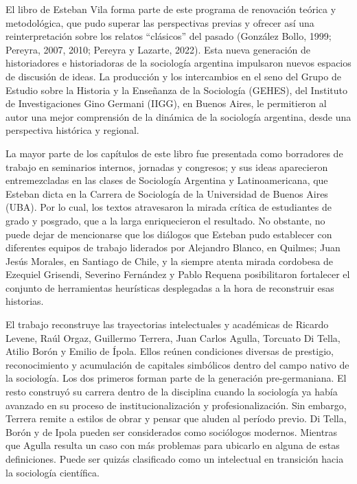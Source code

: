 El libro de Esteban Vila forma parte de este programa de renovación teórica y metodológica, que pudo superar las perspectivas previas y ofrecer así una reinterpretación sobre los relatos \enquote{clásicos} del pasado \parencite{1547-NOE2005,1550-BLOIS2018,1565-BLANCO2006}(González Bollo, 1999; Pereyra, 2007, 2010; Pereyra y Lazarte, 2022). Esta nueva generación de historiadores e historiadoras de la sociología argentina impulsaron nuevos espacios de discusión de ideas. La producción y los intercambios en el seno del Grupo de Estudio sobre la Historia y la Enseñanza de la Sociología (GEHES), del Instituto de Investigaciones Gino Germani (IIGG), en Buenos Aires, le permitieron al autor una mejor comprensión de la dinámica de la sociología argentina, desde una perspectiva histórica y regional.

La mayor parte de los capítulos de este libro fue presentada como borradores de trabajo en seminarios internos, jornadas y congresos; y sus ideas aparecieron entremezcladas en las clases de Sociología Argentina y Latinoamericana, que Esteban dicta en la Carrera de Sociología de la Universidad de Buenos Aires (UBA). Por lo cual, los textos atravesaron la mirada crítica de estudiantes de grado y posgrado, que a la larga enriquecieron el resultado. No obstante, no puede dejar de mencionarse que los diálogos que Esteban pudo establecer con diferentes equipos de trabajo liderados por Alejandro Blanco, en Quilmes; Juan Jesús Morales, en Santiago de Chile, y la siempre atenta mirada cordobesa de Ezequiel Grisendi, Severino Fernández y Pablo Requena posibilitaron fortalecer el conjunto de herramientas heurísticas desplegadas a la hora de reconstruir esas historias.

El trabajo reconstruye las trayectorias intelectuales y académicas de Ricardo Levene, Raúl Orgaz, Guillermo Terrera, Juan Carlos Agulla, Torcuato Di Tella, Atilio Borón y Emilio de Ípola. Ellos reúnen condiciones diversas de prestigio, reconocimiento y acumulación de capitales simbólicos dentro del campo nativo de la sociología. Los dos primeros forman parte de la generación pre-germaniana. El resto construyó su carrera dentro de la disciplina cuando la sociología ya había avanzado en su proceso de institucionalización y profesionalización. Sin embargo, Terrera remite a estilos de obrar y pensar que aluden al período previo. Di Tella, Borón y de Ipola pueden ser considerados como sociólogos modernos. Mientras que Agulla resulta un caso con más problemas para ubicarlo en alguna de estas definiciones. Puede ser quizás clasificado como un intelectual en transición hacia la sociología científica.

